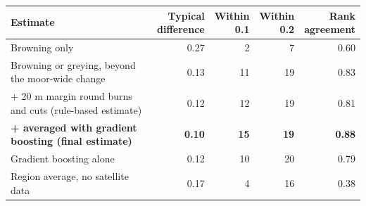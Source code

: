 \begin{tabular}{>{\raggedright\arraybackslash}p{7.2cm}rrrr}
\toprule
Estimate & \makecell[r]{Typical\\difference} & \makecell[r]{Within\\0.1} & \makecell[r]{Within\\0.2} & \makecell[r]{Rank\\agreement} \\
\midrule
Browning only & 0.27 & 2 & 7 & 0.60 \\
Browning or greying, beyond the moor-wide change & 0.13 & 11 & 19 & 0.83 \\
+ 20 m margin round burns and cuts (rule-based estimate) & 0.12 & 12 & 19 & 0.81 \\
\textbf{+ averaged with gradient boosting (final estimate)} & \textbf{0.10} & \textbf{15} & \textbf{19} & \textbf{0.88} \\
\midrule
Gradient boosting alone & 0.12 & 10 & 20 & 0.79 \\
Region average, no satellite data & 0.17 & 4 & 16 & 0.38 \\
\bottomrule
\end{tabular}
